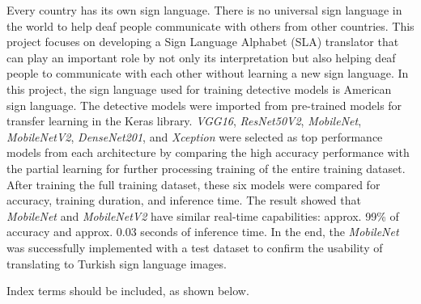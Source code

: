 Every country has its own sign language. There is no universal sign language in the world to help deaf people communicate with others from other countries. This project focuses on developing a Sign Language Alphabet (SLA) translator that can play an important role by not only its interpretation but also helping deaf people to communicate with each other without learning a new sign language. In this project, the sign language used for training detective models is American sign language. The detective models were imported from pre-trained models for transfer learning in the Keras library. \textit{VGG16}, \textit{ResNet50V2}, \textit{MobileNet}, \textit{MobileNetV2}, \textit{DenseNet201}, and \textit{Xception} were selected as top performance models from each architecture by comparing the high accuracy performance with the partial learning for further processing training of the entire training dataset. After training the full training dataset, these six models were compared for accuracy, training duration, and inference time. The result showed that \textit{MobileNet} and \textit{MobileNetV2} have similar real-time capabilities: approx. 99\% of accuracy and approx. 0.03 seconds of inference time. In the end, the \textit{MobileNet} was successfully implemented with a test dataset to confirm the usability of translating to Turkish sign language images.

  Index terms should be included, as shown below.